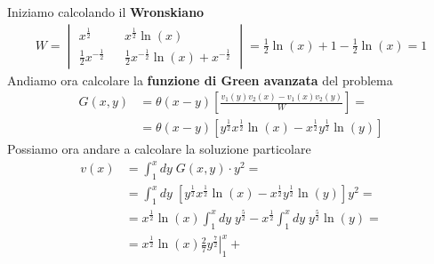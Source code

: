 Iniziamo calcolando il \textbf{Wronskiano}
\begin{align}
	W = \begin{vmatrix}
		x^\frac{1}{2} && x^\frac{1}{2} \ln(x) \\
		\frac{1}{2}x^{-\frac{1}{2}} && \frac{1}{2}x^{-\frac{1}{2}} \ln(x) + x^{-\frac{1}{2}}
	\end{vmatrix} = \frac{1}{2} \ln(x) + 1 - \frac{1}{2}\ln(x) = 1
\end{align}
Andiamo ora calcolare la \textbf{funzione di Green avanzata} del problema
\begin{align}
	G(x,y) &= \theta(x-y)\left[ \frac{v_1(y) v_2(x) -v_1(x)v_2(y)}{W} \right] = \nonumber \\
	&= \theta(x-y)\left[y^\frac{1}{2} x^\frac{1}{2} \ln(x) - x^\frac{1}{2} y^\frac{1}{2}\ln(y) \right] 
\end{align}
Possiamo ora andare a calcolare la soluzione particolare
\begin{align}
	v(x) &= \int_{1}^{x} dy \; G(x,y) \cdot y^2 = \nonumber\\
	&= \int_{1}^{x} dy \; \left[y^\frac{1}{2} x^\frac{1}{2} \ln(x) - x^\frac{1}{2} y^\frac{1}{2}\ln(y) \right] y^2 = \nonumber\\
	&= x^\frac{1}{2} \ln(x)\int_{1}^{x} dy \;y^\frac{5}{2} - x^\frac{1}{2}\int_{1}^{x} dy \; y^\frac{5}{2}\ln(y)  = \nonumber\\
	&= x^\frac{1}{2} \ln(x) \left.\frac{2}{7}y^{\frac{7}{2}} \right|_1^x + 
\end{align}

\newpage